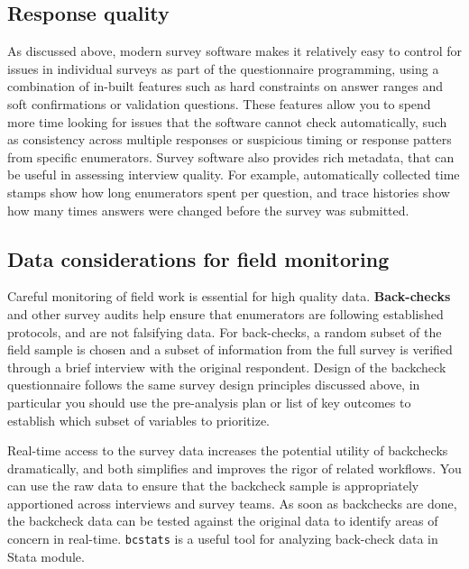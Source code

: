 {\subsection{Response quality}
As discussed above, modern survey software makes it relatively easy to control for issues in individual surveys as part of the questionnaire programming, using a combination of in-built features such as hard constraints on answer ranges and soft confirmations or validation questions. These features allow you to spend more time looking for issues that the software cannot check automatically, such as consistency across multiple responses or suspicious timing or response patters from specific enumerators. 
 Survey software also provides rich metadata, that can be useful in assessing interview quality. For example, automatically collected time stamps show how long enumerators spent per question, and trace histories show how many times answers were changed before the survey was submitted. 


\subsection{Data considerations for field monitoring}
Careful monitoring of field work is essential for high quality data.  
\textbf{Back-checks} and other survey audits help ensure that enumerators are following established protocols, and are not falsifying data. 
For back-checks, a random subset of the field sample is chosen and a subset of information from the full survey is verified through a brief interview with the original respondent. 
Design of the backcheck questionnaire follows the same survey design principles discussed above, in particular you should use the pre-analysis plan or list of key outcomes to establish which subset of variables to prioritize. 

Real-time access to the survey data increases the potential utility of backchecks dramatically, and both simplifies and improves the rigor of related workflows. 
You can use the raw data to ensure that the backcheck sample is appropriately apportioned across interviews and survey teams. 
As soon as backchecks are done, the backcheck data can be tested against the original data to identify areas of concern in real-time. 
\texttt{bcstats} is a useful tool for analyzing back-check data in Stata module. 

}

